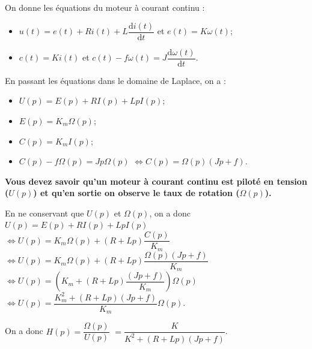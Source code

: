 \normaltrue \difficilefalse \tdifficilefalse
\correctiontrue


\setcounter{question}{0}%
\ifcorrection
\else
{}
\fi


\ifprof 
\else
On donne les équations du moteur à courant continu :
\begin{itemize}
\item $u(t) = e(t)+ Ri(t) +L \dfrac{\text{d}i(t)}{\text{d} t}$ et $e(t)=K\omega(t)$;
\item $c(t)=Ki(t)$ et $c(t)- f\omega(t)=J\dfrac{\text{d}\omega(t)}{\text{d} t}$.
\end{itemize}
\fi

\ifprof
En passant les équations dans le domaine de Laplace, on a : 
\begin{itemize}
\item $U(p) = E(p)+ RI(p) +LpI(p)$;
\item $E(p)=K_m\Omega(p)$;
\item $C(p)=K_mI(p)$;
\item $C(p)- f\Omega(p)=Jp\Omega(p)$ $\Leftrightarrow C(p)=\Omega(p)\left( Jp +f \right)$.
\end{itemize}

\textbf{Vous devez savoir qu'un moteur à courant continu est piloté en tension ($U(p)$) et qu'en sortie on observe le taux de rotation ($\Omega(p)$). }

En ne conservant que $U(p)$ et $\Omega(p)$, on a donc
$U(p) = E(p)+ RI(p) +LpI(p)$
$ \Leftrightarrow U(p) = K_m\Omega(p)+ \left(R +Lp\right)\dfrac{C(p)}{K_m}$
$ \Leftrightarrow U(p) = K_m\Omega(p)+ \left(R +Lp\right)\dfrac{\Omega(p)\left( Jp +f \right)}{K_m}$
$ \Leftrightarrow U(p) = \left(K_m+ \left(R +Lp\right)\dfrac{\left( Jp +f \right)}{K_m}\right)\Omega(p)$
$ \Leftrightarrow U(p) =  \dfrac{K_m^2 + \left(R +Lp\right)\left( Jp +f \right)}{K_m}\Omega(p)$.

On a donc $H(p)=\dfrac{\Omega(p)}{U(p)}$ $=\dfrac{K}{K^2 +\left(R +Lp\right) \left( Jp +f \right)} $.

\else
\fi

